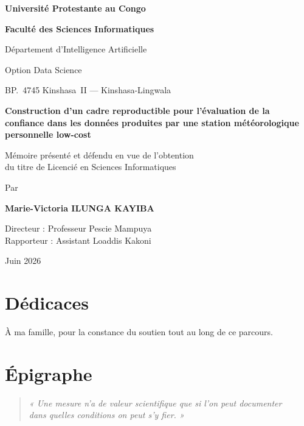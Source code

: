 \documentclass[12pt,a4paper]{report}
\begin{document}
\begin{titlepage}
\centering
{\bfseries Université Protestante au Congo\par}
\vspace{0.4em}
{\bfseries Faculté des Sciences Informatiques\par}
\vspace{0.3em}
Département d'Intelligence Artificielle\par
Option Data Science\par
BP.~4745 Kinshasa~II --- Kinshasa-Lingwala\par
\vspace{2.2em}

{\LARGE\bfseries Construction d'un cadre reproductible pour l'évaluation de la confiance dans les données produites par une station météorologique personnelle low-cost\par}

\vspace{2em}
Mémoire présenté et défendu en vue de l'obtention\\
du titre de Licencié en Sciences Informatiques\par

\vspace{1.8em}
{\large Par\par}
\vspace{0.6em}
{\Large\bfseries Marie-Victoria ILUNGA KAYIBA\par}

\vspace{2.2em}
\begin{flushleft}
Directeur : Professeur Pescie Mampuya\\
Rapporteur : Assistant Loaddis Kakoni
\end{flushleft}

\vfill
Juin 2026
\end{titlepage}

\chapter*{Dédicaces}
À ma famille, pour la constance du soutien tout au long de ce parcours.
\cleardoublepage

\chapter*{Épigraphe}
\begin{quote}
\textit{« Une mesure n'a de valeur scientifique que si l'on peut documenter\\
dans quelles conditions on peut s'y fier. »}
\end{quote}
\cleardoublepage
\end{document}
